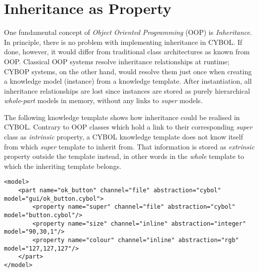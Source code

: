 %
%
%
%
%
%

\section{Inheritance as Property}
\label{inheritance_as_property_heading}

One fundamental concept of \emph{Object Oriented Programming} (OOP) is
\emph{Inheritance}. In principle, there is no problem with implementing
inheritance in CYBOL. If done, however, it would differ from traditional class
architectures as known from OOP. Classical OOP systems resolve inheritance
relationships at runtime; CYBOP systems, on the other hand, would resolve them
just once when creating a knowledge model (instance) from a knowledge template.
After instantiation, all inheritance relationships are lost since instances are
stored as purely hierarchical \emph{whole}-\emph{part} models in memory,
without any links to \emph{super} models.

The following knowledge template shows how inheritance could be realised in
CYBOL. Contrary to OOP classes which hold a link to their corresponding
\emph{super} class as \emph{intrinsic} property, a CYBOL knowledge template
does not know itself from which \emph{super} template to inherit from. That
information is stored as \emph{extrinsic} property outside the template
instead, in other words in the \emph{whole} template to which the inheriting
template belongs.

\begin{scriptsize}
    \begin{verbatim}
<model>
    <part name="ok_button" channel="file" abstraction="cybol" model="gui/ok_button.cybol">
        <property name="super" channel="file" abstraction="cybol" model="button.cybol"/>
        <property name="size" channel="inline" abstraction="integer" model="90,30,1"/>
        <property name="colour" channel="inline" abstraction="rgb" model="127,127,127"/>
    </part>
</model>
    \end{verbatim}
\end{scriptsize}

